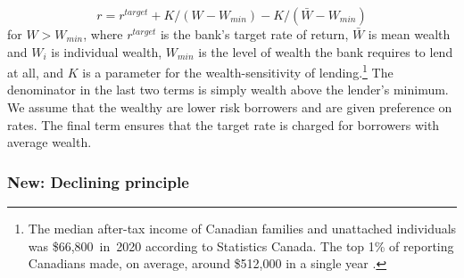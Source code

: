 {\begin{equation}
{r} = r^{target}+ K/(W-W_{min}) -K/(\bar W - W_{min})\label{eqn-interest-wealth-relationship}
\end{equation}
for $W>W_{min}$, where  $r^{target}$ is the bank's target rate of return,  $\bar{W}$ is mean wealth and $W_i$ is individual wealth, $W_{min}$ is the level of wealth the bank requires to lend at all, and $K$ is a parameter for the wealth-sensitivity of lending.\footnote{The median after-tax income of Canadian families and unattached individuals was \$66,800 in 2020 according to Statistics Canada. %
 The top 1\% of reporting Canadians made, on average, around \$512,000 in a single year \cite{WEB_model-stats-can-canadian-incomes}. %
} The denominator in the last two terms is simply wealth above the lender's minimum. We assume that the wealthy are lower risk borrowers and are given preference on rates. The final term ensures that the target rate is charged for borrowers with average wealth.





\subsubsection{New: Declining principle}\label{sec:declining-principle}

}
